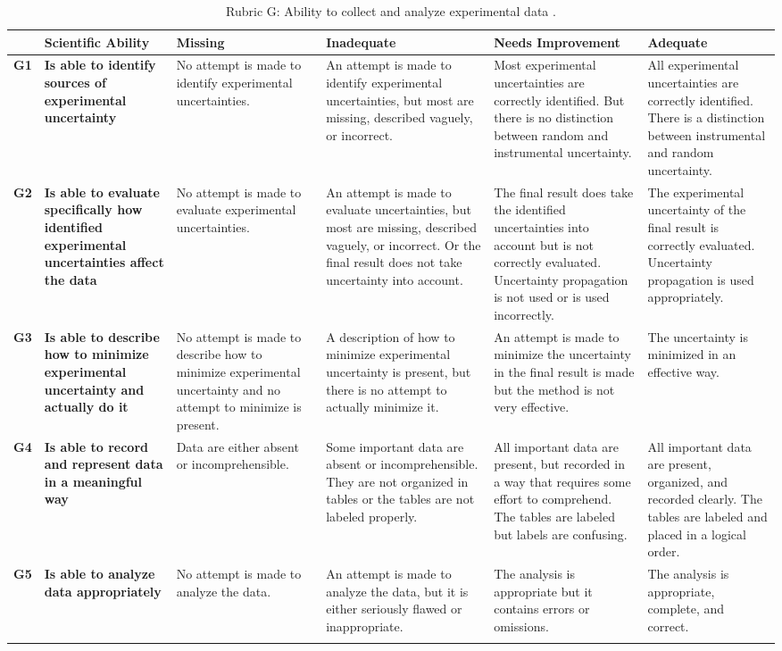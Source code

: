 \begin{landscape}
\begin{longtable}{>{\bfseries}p{0.02\textheight}|>{\bfseries\RaggedRight}p{0.25\textheight}|>{\RaggedRight}p{0.21\textheight}|>{\RaggedRight}p{0.21\textheight}|>{\RaggedRight}p{0.22\textheight}|>{\RaggedRight}p{0.22\textheight}}
	\toprule
	& Scientific Ability
	& Missing & Inadequate & Needs Improvement & Adequate \\ \midrule \endhead	
	G1
	& Is able to identify sources of experimental uncertainty
	& No attempt is made to identify experimental uncertainties.
	& An attempt is made to identify experimental uncertainties, but most are missing, described vaguely, or incorrect.
	& Most experimental uncertainties are correctly identified. But there is no distinction between random and instrumental uncertainty.
	& All experimental uncertainties are correctly identified. There is a distinction between instrumental and random uncertainty.
	\\ \midrule
	G2
	& Is able to evaluate specifically how identified experimental uncertainties affect the data
	& No attempt is made to evaluate experimental uncertainties.
	& An attempt is made to evaluate uncertainties, but most are missing, described vaguely, or incorrect. Or the final result does not take uncertainty into account.
	& The final result does take the identified uncertainties into account but is not correctly evaluated. Uncertainty propagation is not used or is used incorrectly.
	& The experimental uncertainty of the final result is correctly evaluated. Uncertainty propagation is used appropriately.
	\\ \midrule
	G3
	& Is able to describe how to minimize experimental uncertainty and actually do it
	& No attempt is made to describe how to minimize experimental uncertainty and no attempt to minimize is present.
	& A description of how to minimize experimental uncertainty is present, but there is no attempt to actually minimize it.
	& An attempt is made to minimize the uncertainty in the final result is made but the method is not very effective.
	& The uncertainty is minimized in an effective way.
	\\ \midrule
	G4
	& Is able to record and represent data in a meaningful way
	& Data are either absent or incomprehensible.
	& Some important data are absent or incomprehensible. They are not organized in tables or the tables are not labeled properly.
	& All important data are present, but recorded in a way that requires some effort to comprehend. The tables are labeled but labels are confusing.
	& All important data are present, organized, and recorded clearly. The tables are labeled and placed in a logical order.
	\\ \midrule
	G5
	& Is able to analyze data appropriately
	& No attempt is made to analyze the data.
	& An attempt is made to analyze the data, but it is either seriously flawed or inappropriate.
	& The analysis is appropriate but it contains errors or omissions.
	& The analysis is appropriate, complete, and correct.
	\\
	\bottomrule
	\caption{Rubric G: Ability to collect and analyze experimental data \cite{etkina_scientific_2006}.}\label{rubric:g}
\end{longtable}

\end{landscape}